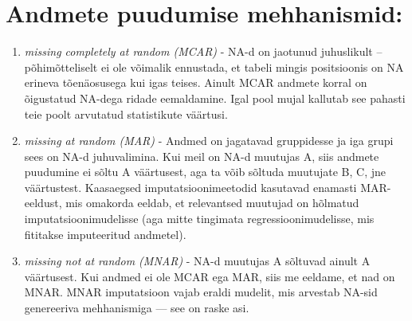 \documentclass[]{book}
\newenvironment{Shaded}{\begin{snugshade}}{\end{snugshade}}
\newcommand{\KeywordTok}[1]{\textcolor[rgb]{0.13,0.29,0.53}{\textbf{#1}}}
\newcommand{\DataTypeTok}[1]{\textcolor[rgb]{0.13,0.29,0.53}{#1}}
\newcommand{\FloatTok}[1]{\textcolor[rgb]{0.00,0.00,0.81}{#1}}
\newcommand{\StringTok}[1]{\textcolor[rgb]{0.31,0.60,0.02}{#1}}
\newcommand{\CommentTok}[1]{\textcolor[rgb]{0.56,0.35,0.01}{\textit{#1}}}
\newcommand{\ControlFlowTok}[1]{\textcolor[rgb]{0.13,0.29,0.53}{\textbf{#1}}}
\newcommand{\OperatorTok}[1]{\textcolor[rgb]{0.81,0.36,0.00}{\textbf{#1}}}
\newcommand{\NormalTok}[1]{#1}
\begin{document}
\begin{Shaded}
\end{Shaded}

\section{Andmete puudumise
mehhanismid:}\label{andmete-puudumise-mehhanismid}

\begin{enumerate}
\def\labelenumi{\arabic{enumi}.}
\item
  \emph{missing completely at random (MCAR)} - NA-d on jaotunud
  juhuslikult -- põhimõtteliselt ei ole võimalik ennustada, et tabeli
  mingis positsioonis on NA erineva tõenäosusega kui igas teises. Ainult
  MCAR andmete korral on õigustatud NA-dega ridade eemaldamine. Igal
  pool mujal kallutab see pahasti teie poolt arvutatud statistikute
  väärtusi.
\item
  \emph{missing at random (MAR)} - Andmed on jagatavad gruppidesse ja
  iga grupi sees on NA-d juhuvalimina. Kui meil on NA-d muutujas A, siis
  andmete puudumine ei sõltu A väärtusest, aga ta võib sõltuda muutujate
  B, C, jne väärtustest. Kaasaegsed imputatsioonimeetodid kasutavad
  enamasti MAR-eeldust, mis omakorda eeldab, et relevantsed muutujad on
  hõlmatud imputatsioonimudelisse (aga mitte tingimata
  regressioonimudelisse, mis fititakse imputeeritud andmetel).
\item
  \emph{missing not at random (MNAR)} - NA-d muutujas A sõltuvad ainult
  A väärtusest. Kui andmed ei ole MCAR ega MAR, siis me eeldame, et nad
  on MNAR. MNAR imputatsioon vajab eraldi mudelit, mis arvestab NA-sid
  genereeriva mehhanismiga --- see on raske asi.
\end{enumerate}
\end{document}

